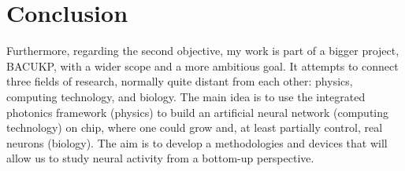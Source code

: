 \chapter*{Conclusion}

Furthermore, regarding the second objective, my work is part of a bigger project, BACUKP, with a wider scope and a more ambitious goal.
It attempts to connect three fields of research, normally quite distant from each other: physics, computing technology, and biology.
The main idea is to use the integrated photonics framework (physics) to build an artificial neural network (computing technology) on chip, where one could grow and, at least partially control, real neurons (biology).
The aim is to develop a methodologies and devices that will allow us to study neural activity from a bottom-up perspective.